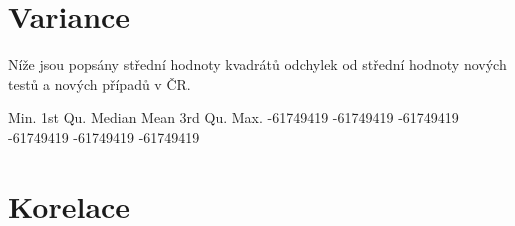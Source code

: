 \documentclass[a4paper, 12pt]{article}
\begin{document}
\clearpage
\section{Variance}

Níže jsou popsány střední hodnoty kvadrátů odchylek od střední hodnoty nových testů
a nových případů v ČR.
\begin{Schunk}
\begin{Soutput}
     Min.   1st Qu.    Median      Mean   3rd Qu.      Max. 
-61749419 -61749419 -61749419 -61749419 -61749419 -61749419 
\end{Soutput}
\end{Schunk}

\section{Korelace}
\end{document}
